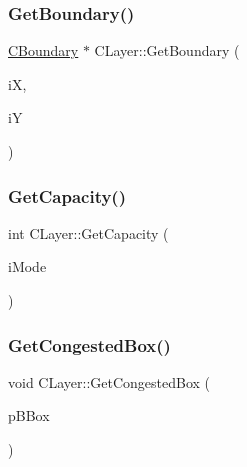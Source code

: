 \mbox{\label{classCLayer_a695927bf07f0de927ac6326fbd3f1d00}} 
\subsubsection{\texorpdfstring{GetBoundary()}{GetBoundary()}\hspace{0.1cm}{\footnotesize\ttfamily [5/5]}}
{\footnotesize\ttfamily \mbox{\hyperlink{classCBoundary}{C\+Boundary}} $\ast$ C\+Layer\+::\+Get\+Boundary (\begin{DoxyParamCaption}\item[{int}]{iX,  }\item[{int}]{iY }\end{DoxyParamCaption})}

\mbox{\label{classCLayer_a7e041ae4b69adbf606236ce0cd4f35a6}} 
\subsubsection{\texorpdfstring{GetCapacity()}{GetCapacity()}}
{\footnotesize\ttfamily int C\+Layer\+::\+Get\+Capacity (\begin{DoxyParamCaption}\item[{int}]{i\+Mode }\end{DoxyParamCaption})}

\mbox{\label{classCLayer_aa4c718690f42ddb1adb4ace397264efc}} 
\subsubsection{\texorpdfstring{GetCongestedBox()}{GetCongestedBox()}}
{\footnotesize\ttfamily void C\+Layer\+::\+Get\+Congested\+Box (\begin{DoxyParamCaption}\item[{\mbox{\hyperlink{classCBBox}{C\+B\+Box}} $\ast$}]{p\+B\+Box }\end{DoxyParamCaption})}

\mbox{\label{classCLayer_a1cf9df5ef7dbe809239709f04e0a0cad}} 
